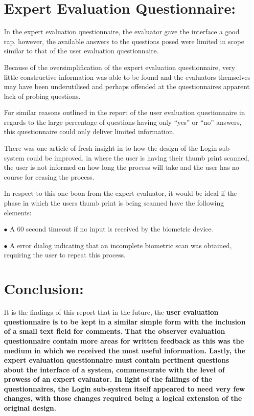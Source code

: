 \section {
	Expert Evaluation Questionnaire:
}

In the expert evaluation questionnaire, the evaluator gave the interface a good
rap, however, the available answers to the questions posed were limited in
scope similar to that of the user evaluation questionnaire.

Because of the oversimplification of the expert evaluation questionnaire, very
little constructive information was able to be found and the evaluators
themselves may have been underutilised and perhaps offended at the
questionnaires apparent lack of probing questions.

For similar reasons outlined in the report of the user evaluation questionnaire
in regards to the large percentage of questions having only ``yes'' or ``no''
answers, this questionnaire could only deliver limited information.

There was one article of fresh insight in to how the design of the Login
sub-system could be improved, in where the user is having their thumb print
scanned, the user is not informed on how long the process will take and the user
has no course for ceasing the process.

In respect to this one boon from the expert evaluator, it would be ideal if
the phase in which the users thumb print is being scanned have the following
elements:

\item{$\bullet$}	A 60 second timeout if no input is received by the
			biometric device.
\item{$\bullet$}	A error dialog indicating that an incomplete biometric
			scan was obtained, requiring the user to repeat this
			process.

\section {
	Conclusion:
}

It is the findings of this report that in the future, the \bf user \rm
evaluation questionnaire is to be kept in a similar simple form with the
inclusion of a small text field for comments. That the \bf observer \rm
evaluation questionnaire contain more areas for written feedback as this was
the medium in which we received the most useful information. Lastly, the
\bf expert \rm evaluation questionnaire must contain pertinent questions about
the interface of a system, commensurate with the level of prowess of an expert
evaluator. In light of the failings of the questionnaires, the Login sub-system
itself appeared to need very few changes, with those changes required being a
logical extension of the original design.

\bye
